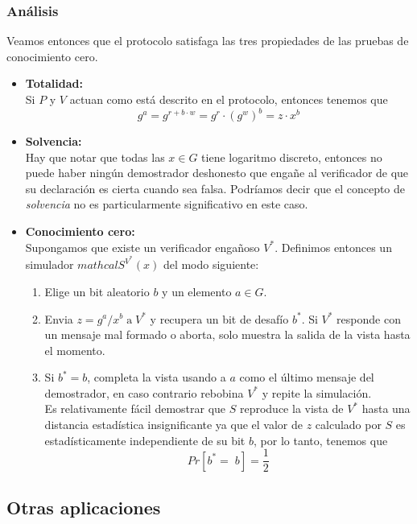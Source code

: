 \documentclass[oneside,10pt]{article}
\begin{document}
\subsubsection{Análisis}
Veamos entonces que el protocolo satisfaga las tres propiedades de las pruebas de conocimiento cero.
\begin{itemize}
\item \textbf{Totalidad:}\\
  Si $P$ y $V$ actuan como está descrito en el protocolo, entonces tenemos que
  \[g^a = g^{r+b \cdot w} = g ^r \cdot (g^w)^b = z \cdot x^b \]
\item \textbf{Solvencia:}\\
  Hay que notar que todas las $x \in G$ tiene logaritmo discreto, entonces no puede haber ningún demostrador deshonesto que engañe al verificador de que su declaración es cierta cuando sea falsa. Podríamos decir que el concepto de \emph{solvencia} no es particularmente significativo en este caso.
\item \textbf{Conocimiento cero:}\\
  Supongamos que existe un verificador engañoso $V^*$. Definimos entonces un simulador $mathcal{S}^{V^*}(x)$ del modo siguiente:
  \begin{enumerate}
  \item Elige un bit aleatorio $b$ y un elemento $a \in G$.
  \item Envia $z = g^a/x^b \;\mathrm{a}\; V^*$ y recupera un bit de desafío $b^*$. Si $V^*$ responde con un mensaje mal formado o aborta, solo muestra la salida de la vista hasta el momento.
  \item Si $b^* = b$, completa la vista usando a $a$ como el último mensaje del demostrador, en caso contrario rebobina $V^*$ y repite la simulación.\\

    Es relativamente fácil demostrar que $S$ reproduce la vista de $V^*$ hasta una distancia estadística insignificante ya que el valor de $z$ calculado por $S$ es estadísticamente independiente de su bit $b$, por lo tanto, tenemos que \[Pr[b^* = \; b ] = \frac{1}{2}\] 
  \end{enumerate}
\end{itemize}

\subsection{Otras aplicaciones}
\end{document}
